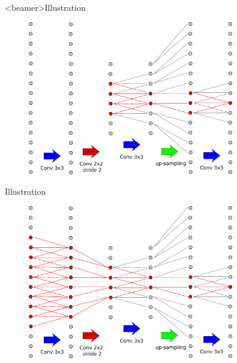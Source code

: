 \documentclass[xcolor=pdftex,dvipsnames,table,mathserif]{beamer}
\begin{document}
\begin{frame}<beamer>{Illustration}

  \begin{figure}
  \includegraphics[width=0.8\textwidth]{receptive_field2.png}
  \end{figure}

\end{frame}

\begin{frame}{Illustration}

  \begin{figure}
  \includegraphics[width=0.8\textwidth]{receptive_field3.png}
  \end{figure}

\end{frame}


\end{document}
